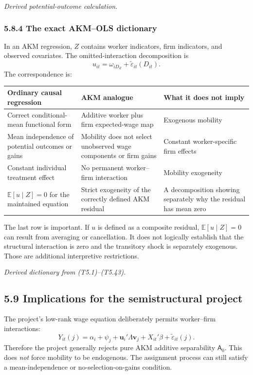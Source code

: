 \documentclass[11pt]{article}
\begin{document}
\textit{Derived potential-outcome calculation.}

\subsubsection{5.8.4 The exact AKM--OLS dictionary}

In an AKM regression, \(Z\) contains worker indicators, firm indicators, and
observed covariates.  The omitted-interaction decomposition is
\[
u_{it}
=
\omega_{iD_{it}}
+\widetilde\varepsilon_{it}(D_{it}).
\tag{T5.43}
\]
The correspondence is:

\begin{longtable}{p{}p{}p{}}
\textbf{Ordinary causal regression} &
\textbf{AKM analogue} &
\textbf{What it does not imply} \\
\hline
Correct conditional-mean functional form &
Additive worker plus firm expected-wage map &
Exogenous mobility \\
Mean independence of potential outcomes or gains &
Mobility does not select unobserved wage components or firm gains &
Constant worker-specific firm effects \\
Constant individual treatment effect &
No permanent worker--firm interaction &
Mobility exogeneity \\
\(\mathbb E[u\mid Z]=0\) for the maintained equation &
Strict exogeneity of the correctly defined AKM residual &
A decomposition showing separately why the residual has mean zero \\
\end{longtable}

The last row is important.  If \(u\) is defined as a composite residual,
\(\mathbb E[u\mid Z]=0\) can result from averaging or cancellation.  It does
not logically establish that the structural interaction is zero and the
transitory shock is separately exogenous.  Those are additional
interpretive restrictions.

\textit{Derived dictionary from (T5.1)--(T5.43).}

\subsection{5.9 Implications for the semistructural project}

The project's low-rank wage equation deliberately permits
worker--firm interactions:
\[
Y_{it}(j)
=
\alpha_i+\psi_j
+\mathbf u_i'\Lambda\mathbf v_j
+X_{it}'\beta
+\widetilde\varepsilon_{it}(j).
\tag{T5.44}
\]
Therefore the project generally rejects pure AKM additive separability
\(\mathsf A_0\).  This does \emph{not} force mobility to be endogenous.
The assignment process can still satisfy a mean-independence or
no-selection-on-gains condition.
\end{document}
